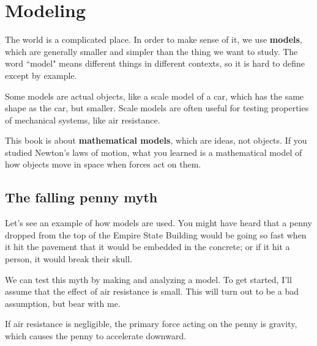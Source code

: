 \documentclass[12pt]{book}
\theoremstyle{exercise}
\begin{document}
\normalsize

\cleardoublepage

\begin{latexonly}


\cleardoublepage

\end{latexonly}

\mainmatter


\chapter{Modeling}
\label{chap01}

The world is a complicated place.  In order to make sense of it, we use {\bf models}, which are generally smaller and simpler than the thing we want to study.  The word ``model" means different things in different contexts, so it is hard to define except by example.

Some models are actual objects, like a scale model of a car, which has the same shape as the car, but smaller.  Scale models are often useful for testing properties of mechanical systems, like air resistance.

This book is about {\bf mathematical models}, which are ideas, not objects.  If you studied Newton's laws of motion, what you learned is a mathematical model of how objects move in space when forces act on them.



\section{The falling penny myth}
\label{penny}

Let's see an example of how models are used.  You might have heard that a penny dropped from the top of the Empire State Building would be going so fast when it hit the pavement that it would be embedded in the concrete; or if it hit a person, it would break their skull.

We can test this myth by making and analyzing a model.  To get started, I'll assume that the effect of air resistance is small.  This will turn out to be a bad assumption, but bear with me.

If air resistance is negligible, the primary force acting on the penny is gravity, which causes the penny to accelerate downward.
\end{document}
